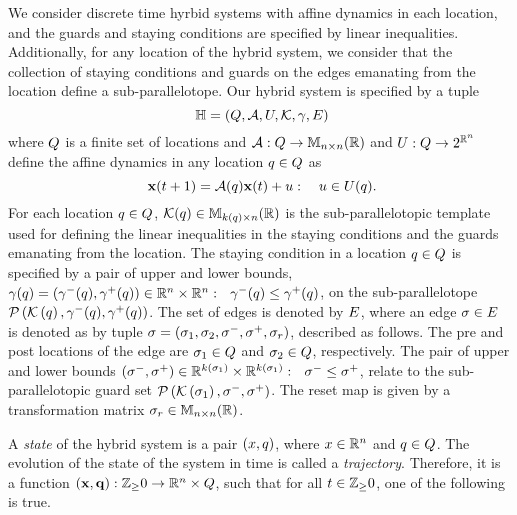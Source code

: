 We consider discrete time hyrbid systems with affine dynamics in each
location, and the guards and staying conditions are specified by
linear inequalities.  Additionally, for any location of the hybrid
system, we consider that the collection of staying conditions and
guards on the edges emanating from the location define a
sub-parallelotope.  Our hybrid system is specified by a tuple
\begin{equation}~\label{eqn:system}
\mathbb{H} =
\left(Q,\mathcal{A},U,\mathcal{K},\gamma,E\right)
\end{equation}
where $Q$ is a finite set of locations and
$\mathcal{A}:Q\rightarrow\mathbb{M}_{n\times n}(\mathbb{R})$ and
$U:Q\rightarrow 2^{\mathbb{R}^n}$ define the affine dynamics in any
location $q\in Q$ as 
\begin{equation}~\label{eqn:next}
{\bf x}(t+1) = \mathcal{A}(q){\bf x}(t)+u:~~~u\in U(q).
\end{equation}
For each location $q\in Q$,
$\mathcal{K}(q)\in\mathbb{M}_{k(q)\times n}(\mathbb{\mathbb{R}})$ is the sub-parallelotopic
template used for defining the linear inequalities in the staying
conditions and the guards emanating from the location.  The staying
condition in a location $q\in Q$ is specified by a pair
of upper and lower bounds,
$\gamma(q)=\left(\gamma^-(q),\gamma^+(q)\right)\in\mathbb{R}^n\times\mathbb{R}^n:
~~\gamma^-(q)\leq\gamma^+(q)$, on the sub-parallelotope
$\mathcal{P}\left(\mathcal{K}\left(q\right),\gamma^-(q),\gamma^+(q)\right)$.  The
set of edges is denoted by $E$, where an edge
$\sigma\in E$ is denoted as by tuple $\sigma =
\left(\sigma_{1},\sigma_{2},\sigma^-,\sigma^+,\sigma_r\right)$, described as
follows.  The pre and post locations of the edge are
$\sigma_{1}\in Q$ and $\sigma_{2}\in Q$,
respectively.  The pair of upper and lower bounds
$\left(\sigma^-,\sigma^+\right)\in\mathbb{R}^{k\left(\sigma_{1}\right)}\times\mathbb{R}^{k\left(\sigma_{1}\right)}:~~\sigma^-\leq\sigma^+$,
relate to the sub-parallelotopic guard set
$\mathcal{P}\left(\mathcal{K}\left(\sigma_{1}\right),\sigma^-,\sigma^+\right)$.  The
reset map is given by a transformation matrix
$\sigma_r\in\mathbb{M}_{n\times n}(\mathbb{R})$.

A \emph{state} of the hybrid system is a pair $(x,q)$, where
$x\in\mathbb{R}^n$ and $q\in Q$.  The evolution of the
state of the system in time is called a \emph{trajectory}.  Therefore,
it is a function
$\left({\bf x},{\bf q}\right):\mathbb{Z}_\geq 0\rightarrow\mathbb{R}^n\times Q$, such
that for all $t\in\mathbb{Z}_\geq 0$, one of the following is true.

